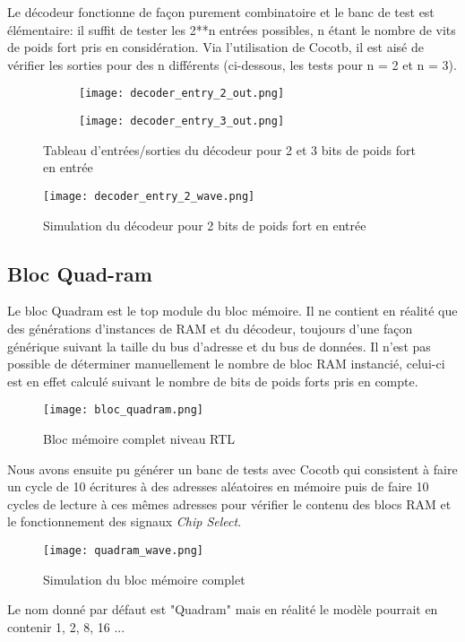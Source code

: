 \indent Le décodeur fonctionne de façon purement combinatoire et le banc de test est élémentaire: il suffit de tester les 2**n entrées possibles, n étant le nombre de vits de poids fort pris en considération. Via l'utilisation de Cocotb, il est aisé de vérifier les sorties pour des n différents (ci-dessous, les tests pour n = 2 et n = 3).

\begin{figure}[h]
	\centering
	\begin{subfigure}{0.3\textwidth}
		\texttt{[image: decoder\_entry\_2\_out.png]} 
	\end{subfigure}
	\hfill
	\begin{subfigure}{0.3\textwidth}
		\texttt{[image: decoder\_entry\_3\_out.png]}
	\end{subfigure}
	\caption{Tableau d'entrées/sorties du décodeur pour 2 et 3 bits de poids fort en entrée}
	\label{fig:stdout_decoder_2_3}
\end{figure}


\begin{figure}[h]
	\centering
	\texttt{[image: decoder\_entry\_2\_wave.png]}
	\caption{Simulation du décodeur pour 2 bits de poids fort en entrée}
	\label{fig:wave_bloc_decoder}
\end{figure}

\newpage

\subsection{Bloc Quad-ram}

\indent Le bloc Quadram est le top module du bloc mémoire. Il ne contient en réalité que des générations d'instances de RAM et du décodeur, toujours d'une façon générique suivant la taille du bus d'adresse et du bus de données. Il n'est pas possible de déterminer manuellement le nombre de bloc RAM instancié, celui-ci est en effet calculé suivant le nombre de bits de poids forts pris en compte.

\begin{figure}[h]
	\centering
	\texttt{[image: bloc\_quadram.png]}
	\caption{Bloc mémoire complet niveau RTL}
	\label{fig:synth_bloc_quadram}
\end{figure}

\indent Nous avons ensuite pu générer un banc de tests avec Cocotb qui consistent à faire un cycle de 10 écritures à des adresses aléatoires en mémoire puis de faire 10 cycles de lecture à ces mêmes adresses pour vérifier le contenu des blocs RAM et le fonctionnement des signaux \textit{Chip Select}.

\begin{figure}[h]
	\centering
	\texttt{[image: quadram\_wave.png]}
	\caption{Simulation du bloc mémoire complet}
	\label{fig:wave_bloc_quadram}
\end{figure}

\indent Le nom donné par défaut est "Quadram" mais en réalité le modèle pourrait en contenir 1, 2, 8, 16 ...

